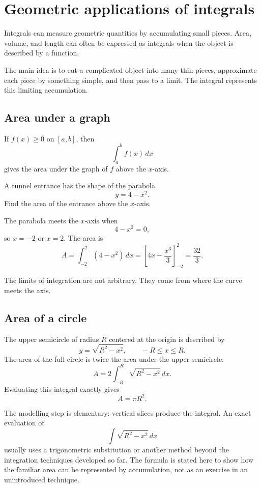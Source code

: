 \section{Geometric applications of integrals}

Integrals can measure geometric quantities by accumulating small pieces. Area, volume, and length can often be expressed as integrals when the object is described by a function.

The main idea is to cut a complicated object into many thin pieces, approximate each piece by something simple, and then pass to a limit. The integral represents this limiting accumulation.

\subsection*{Area under a graph}

If \(f(x)\ge0\) on \([a,b]\), then
\[
\int_a^b f(x)\,dx
\]
gives the area under the graph of \(f\) above the \(x\)-axis.

\begin{examplebox}
A tunnel entrance has the shape of the parabola
\[
y=4-x^2.
\]
Find the area of the entrance above the \(x\)-axis.

The parabola meets the \(x\)-axis when
\[
4-x^2=0,
\]
so \(x=-2\) or \(x=2\). The area is
\[
A=\int_{-2}^{2}(4-x^2)\,dx
=\left[4x-\frac{x^3}{3}\right]_{-2}^{2}
=\frac{32}{3}.
\]
\end{examplebox}

The limits of integration are not arbitrary. They come from where the curve meets the axis.

\subsection*{Area of a circle}

The upper semicircle of radius \(R\) centered at the origin is described by
\[
y=\sqrt{R^2-x^2},
\qquad -R\le x\le R.
\]
The area of the full circle is twice the area under the upper semicircle:
\[
A=2\int_{-R}^{R}\sqrt{R^2-x^2}\,dx.
\]
Evaluating this integral exactly gives
\[
A=\pi R^2.
\]

\begin{remarkbox}
The modelling step is elementary: vertical slices produce the integral. An exact evaluation of
\[
\int\sqrt{R^2-x^2}\,dx
\]
usually uses a trigonometric substitution or another method beyond the integration techniques developed so far. The formula is stated here to show how the familiar area can be represented by accumulation, not as an exercise in an unintroduced technique.
\end{remarkbox}

